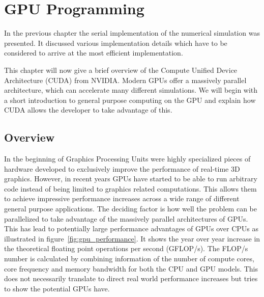 \documentclass[a4paper,11pt]{kth-mag}
\begin{document}
\chapter{GPU Programming}
\label{cha:gpu_programming}

In the previous chapter the serial implementation of the numerical simulation was presented. It discussed various implementation details which have to be considered to arrive at the most efficient implementation.

This chapter will now give a brief overview of the Compute Unified Device Architecture (CUDA) from NVIDIA. Modern GPUs offer a massively parallel architecture, which can accelerate many different simulations. We will begin with a short introduction to general purpose computing on the GPU and explain how CUDA allows the developer to take advantage of this.

\section{Overview}
In the beginning of Graphics Processing Units were highly specialized pieces of hardware developed to exclusively improve the performance of real-time 3D graphics. However, in recent years GPUs have started to be able to run arbitrary code instead of being limited to graphics related computations. This allows them to achieve impressive performance increases across a wide range of different general purpose applications. The deciding factor is how well the problem can be parallelized to take advantage of the massively parallel architectures of GPUs. This has lead to potentially large performance advantages of GPUs over CPUs as illustrated in figure~\ref{fig:gpu_performance}. It shows the year over year increase in the theoretical floating point operations per second (GFLOP/s). The FLOP/s number is calculated by combining information of the number of compute cores, core frequency and memory bandwidth for both the CPU and GPU models. This does not necessarily translate to direct real world performance increases but tries to show the potential GPUs have.
\end{document}
